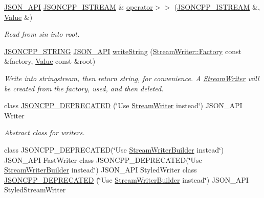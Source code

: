 \begin{DoxyCompactItemize}
\item 
\hyperlink{json_8h_a1d61ffde86ce1a18fd83194ff0d9a206_a1d61ffde86ce1a18fd83194ff0d9a206}{J\+S\+O\+N\+\_\+\+A\+PI} \hyperlink{json_8h_a15f2f70b2ce0a2abd0f8112393dbc4de_a15f2f70b2ce0a2abd0f8112393dbc4de}{J\+S\+O\+N\+C\+P\+P\+\_\+\+I\+S\+T\+R\+E\+AM} \& \hyperlink{namespaceJson_a244ed0996aba750c40c1641c06bba449_a244ed0996aba750c40c1641c06bba449}{operator$>$$>$} (\hyperlink{json_8h_a15f2f70b2ce0a2abd0f8112393dbc4de_a15f2f70b2ce0a2abd0f8112393dbc4de}{J\+S\+O\+N\+C\+P\+P\+\_\+\+I\+S\+T\+R\+E\+AM} \&, \hyperlink{classJson_1_1Value}{Value} \&)
\begin{DoxyCompactList}\small\item\em Read from \textquotesingle{}sin\textquotesingle{} into \textquotesingle{}root\textquotesingle{}. \end{DoxyCompactList}\item 
\hyperlink{json_8h_a1e723f95759de062585bc4a8fd3fa4be_a1e723f95759de062585bc4a8fd3fa4be}{J\+S\+O\+N\+C\+P\+P\+\_\+\+S\+T\+R\+I\+NG} \hyperlink{json_8h_a1d61ffde86ce1a18fd83194ff0d9a206_a1d61ffde86ce1a18fd83194ff0d9a206}{J\+S\+O\+N\+\_\+\+A\+PI} \hyperlink{namespaceJson_a00820c0084189e2a7533531c0f250e3f_a00820c0084189e2a7533531c0f250e3f}{write\+String} (\hyperlink{classJson_1_1StreamWriter_1_1Factory}{Stream\+Writer\+::\+Factory} const \&factory, \hyperlink{classJson_1_1Value}{Value} const \&root)
\begin{DoxyCompactList}\small\item\em Write into stringstream, then return string, for convenience. A \hyperlink{classJson_1_1StreamWriter}{Stream\+Writer} will be created from the factory, used, and then deleted. \end{DoxyCompactList}\item 
class \hyperlink{namespaceJson_a677dd20047c0c6e4eb16c5f1b53f703c_a677dd20047c0c6e4eb16c5f1b53f703c}{J\+S\+O\+N\+C\+P\+P\+\_\+\+D\+E\+P\+R\+E\+C\+A\+T\+ED} (\char`\"{}Use \hyperlink{classJson_1_1StreamWriter}{Stream\+Writer} instead\char`\"{}) J\+S\+O\+N\+\_\+\+A\+PI Writer
\begin{DoxyCompactList}\small\item\em Abstract class for writers. \end{DoxyCompactList}\item 
class J\+S\+O\+N\+C\+P\+P\+\_\+\+D\+E\+P\+R\+E\+C\+A\+T\+ED(\char`\"{}Use \hyperlink{classJson_1_1StreamWriterBuilder}{Stream\+Writer\+Builder} instead\char`\"{}) J\+S\+O\+N\+\_\+\+A\+PI Fast\+Writer class J\+S\+O\+N\+C\+P\+P\+\_\+\+D\+E\+P\+R\+E\+C\+A\+T\+ED(\char`\"{}Use \hyperlink{classJson_1_1StreamWriterBuilder}{Stream\+Writer\+Builder} instead\char`\"{}) J\+S\+O\+N\+\_\+\+A\+PI Styled\+Writer class \hyperlink{namespaceJson_a9013c5f4f4ff260225b101a18af45262_a9013c5f4f4ff260225b101a18af45262}{J\+S\+O\+N\+C\+P\+P\+\_\+\+D\+E\+P\+R\+E\+C\+A\+T\+ED} (\char`\"{}Use \hyperlink{classJson_1_1StreamWriterBuilder}{Stream\+Writer\+Builder} instead\char`\"{}) J\+S\+O\+N\+\_\+\+A\+PI Styled\+Stream\+Writer

\end{DoxyCompactItemize}
